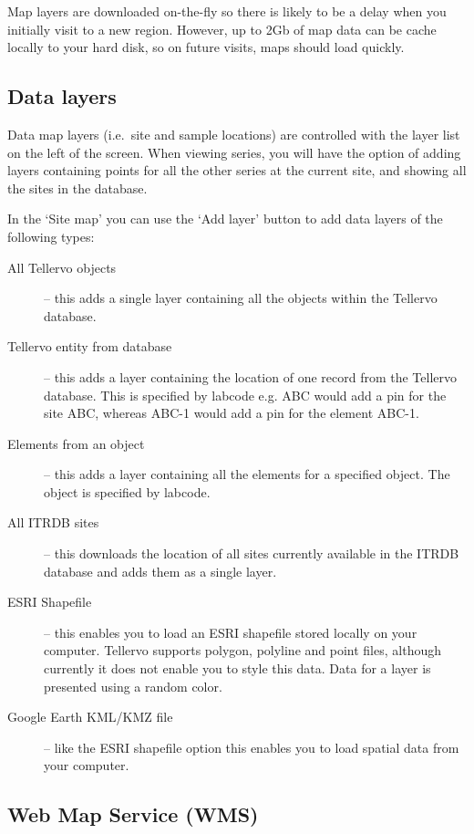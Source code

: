 Map layers are downloaded on-the-fly so there is likely to be a delay when you initially visit to a new region. However, up to 2Gb of map data can be cache locally to your hard disk, so on future visits, maps should load quickly.

\subsection{Data layers}
Data map layers (i.e.\ site and sample locations) are controlled with the layer list on the left of the screen. When viewing series, you will have the option of adding layers containing points for all the other series at the current site, and showing all the sites in the database. 

In the `Site map' you can use the `Add layer' button to add data layers of the following types:

\begin{description}
 \item[All Tellervo objects] -- this adds a single layer containing all the objects within the Tellervo database.
 \item[Tellervo entity from database] -- this adds a layer containing the location of one record from the Tellervo database.  This is specified by labcode e.g. ABC would add a pin for the site ABC, whereas ABC-1 would add a pin for the element ABC-1.
 \item[Elements from an object] -- this adds a layer containing all the elements for a specified object.  The object is specified by labcode.
 \item[All ITRDB sites] -- this downloads the location of all sites currently available in the ITRDB database and adds them as a single layer.
 \item[ESRI Shapefile] -- this enables you to load an ESRI shapefile stored locally on your computer.  Tellervo supports polygon, polyline and point files, although currently it does not enable you to style this data.  Data for a layer is presented using a random color.
 \item[Google Earth KML/KMZ file] -- like the ESRI shapefile option this enables you to load spatial data from your computer.
 \end{description}


\subsection{Web Map Service (WMS)}

